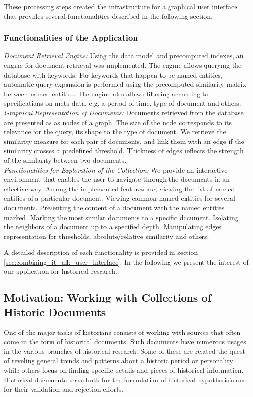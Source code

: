 These processing steps created the infrastructure for a graphical user interface that provides several   functionalities described in the following section.

\subsubsection{Functionalities of the Application}

\emph{Document Retrieval Engine:} Using the data model and precomputed indexes, an engine for document retrieval was implemented. The engine allows querying the database with keywords. For keywords that happen to be named entities, automatic query expansion is performed using the precomputed similarity matrix between named entities.  The engine also allows filtering according to specifications on meta-data, e.g. a period of time, type of document and others.\\ 
\emph{Graphical Representation of Documents:} Documents retrieved from the database are presented as as nodes of a graph. The size of the node corresponds to its relevance for the query, its shape to the type of document.  We retrieve the similarity measure for each pair of documents, and link them with an edge if the similarity crosses a predefined threshold. Thickness of edges reflects the strength of the similarity between two documents.\\
\emph{Functionalities for Exploration of the Collection:} We provide an interactive environment that enables the user to navigate through the documents in an effective way. Among the implemented features are, viewing the list of named entities of a particular document. Viewing common named entities for several documents. Presenting the content of a document with the named entities marked. Marking the most similar documents to a specific document. Isolating the neighbors of a document up to a specified depth. Manipulating edges representation for thresholds, absolute/relative similarity and others.

A detailed description of each functionality is provided in section \ref{sec:combining_it_all:_user_interface}. In the following we present the interest of our application for historical research. 

\subsection{Motivation: Working with Collections of Historic Documents}
\label{sec:motivation}
One of the major tasks of historians consists of working with sources that often come in the form of historical documents. Such documents have numerous usages in the various branches of historical research. Some of these are related the quest of reveling general trends and patterns about a historic period or personality while others focus on finding specific details and pieces of historical information. Historical documents serve both for the formulation of historical hypothesis's and for their validation and rejection efforts. 

